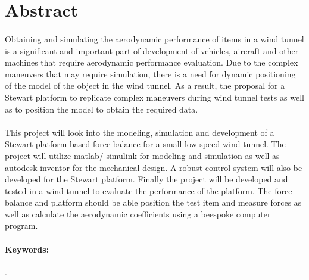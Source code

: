 
\section*{Abstract}
\label{sec:Abstract}
\paragraph{}
Obtaining and simulating the aerodynamic performance of items in a wind tunnel is a
significant and important part of development of vehicles, aircraft and other machines
that require aerodynamic performance evaluation. Due to the complex maneuvers
that may require simulation, there is a need for dynamic positioning of the model of the object in the wind tunnel. As a result, the proposal for a Stewart platform to
replicate complex maneuvers during wind tunnel tests as well as to position the model to
obtain the required data.
\paragraph{}
This project will look into the modeling, simulation and development of a Stewart
platform based force balance for a small low speed wind tunnel. The project will utilize
matlab/ simulink for modeling and simulation as well as autodesk inventor for the mechanical
design. A robust control system will also be developed for the Stewart platform.
Finally the project will be developed and tested in a wind tunnel to evaluate the performance
of the platform. The force balance and platform should be able position the test
item and measure forces as well as calculate the aerodynamic coefficients using a beespoke computer program.

\paragraph{\textbf{Keywords:}} .




